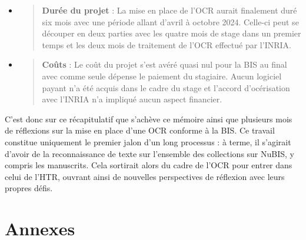 \documentclass[a4paper,12pt,twoside]{book}
\begin{document}
\begin{itemize}
\begin{quote}
	\end{quote}
	\item
	\begin{quote}
		\textbf{Durée du projet} : La mise en place de l'OCR aurait finalement duré six mois avec une période allant d'avril à octobre 2024. Celle-ci peut se découper en deux parties avec les quatre mois de stage dans un premier temps et les deux mois de traitement de l'OCR effectué par l'INRIA.
	\end{quote}
	\item
	\begin{quote}
		\textbf{Coûts} : Le coût du projet s'est avéré quasi nul pour la BIS au final avec comme seule dépense le paiement du stagiaire. Aucun logiciel payant n'a été acquis dans le cadre du stage et l'accord d'océrisation avec l'INRIA n'a impliqué aucun aspect financier. \\
	\end{quote}
\end{itemize} 

C'est donc sur ce récapitulatif que s'achève ce mémoire ainsi que plusieurs mois
de réflexions sur la mise en place d'une OCR conforme à la BIS. Ce
travail constitue uniquement le premier jalon d'un long processus : à
terme, il s'agirait d'avoir de la reconnaissance de texte sur l'ensemble
des collections sur NuBIS, y compris les manuscrits. Cela sortirait
alors du cadre de l'OCR pour entrer dans celui de l'HTR, ouvrant ainsi
de nouvelles perspectives de réflexion avec leurs propres défis. 

\newpage{\pagestyle{empty}\cleardoublepage}
	







\appendix %

\chapter*{Annexes}
\end{document}
